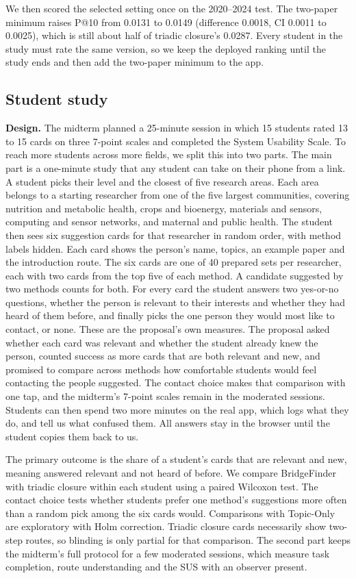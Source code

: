 \documentclass[sigconf,nonacm]{acmart}
\begin{document}
We then scored the selected setting once on the 2020--2024 test. The two-paper minimum raises P@10 from 0.0131 to 0.0149 (difference 0.0018, CI 0.0011 to 0.0025), which is still about half of triadic closure's 0.0287. Every student in the study must rate the same version, so we keep the deployed ranking until the study ends and then add the two-paper minimum to the app.

\subsection{Student study}\label{sec:study}
\textbf{Design.} The midterm planned a 25-minute session in which 15 students rated 13 to 15 cards on three 7-point scales and completed the System Usability Scale. To reach more students across more fields, we split this into two parts. The main part is a one-minute study that any student can take on their phone from a link. A student picks their level and the closest of five research areas. Each area belongs to a starting researcher from one of the five largest communities, covering nutrition and metabolic health, crops and bioenergy, materials and sensors, computing and sensor networks, and maternal and public health. The student then sees six suggestion cards for that researcher in random order, with method labels hidden. Each card shows the person's name, topics, an example paper and the introduction route. The six cards are one of 40 prepared sets per researcher, each with two cards from the top five of each method. A candidate suggested by two methods counts for both. For every card the student answers two yes-or-no questions, whether the person is relevant to their interests and whether they had heard of them before, and finally picks the one person they would most like to contact, or none. These are the proposal's own measures. The proposal asked whether each card was relevant and whether the student already knew the person, counted success as more cards that are both relevant and new, and promised to compare across methods how comfortable students would feel contacting the people suggested. The contact choice makes that comparison with one tap, and the midterm's 7-point scales remain in the moderated sessions. Students can then spend two more minutes on the real app, which logs what they do, and tell us what confused them. All answers stay in the browser until the student copies them back to us.

The primary outcome is the share of a student's cards that are relevant and new, meaning answered relevant and not heard of before. We compare BridgeFinder with triadic closure within each student using a paired Wilcoxon test. The contact choice tests whether students prefer one method's suggestions more often than a random pick among the six cards would. Comparisons with Topic-Only are exploratory with Holm correction. Triadic closure cards necessarily show two-step routes, so blinding is only partial for that comparison. The second part keeps the midterm's full protocol for a few moderated sessions, which measure task completion, route understanding and the SUS with an observer present.
\end{document}
